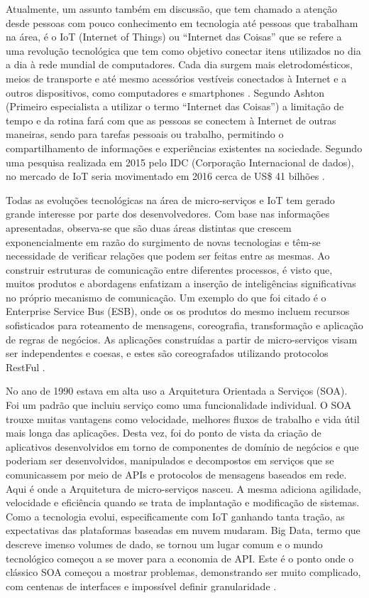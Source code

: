 \documentclass[journal]{IEEEtran}
\begin{document}
Atualmente, um assunto também em discussão, que tem chamado a atenção desde pessoas com pouco conhecimento em tecnologia até pessoas que trabalham na área, é o IoT (Internet of Things) ou “Internet das Coisas”  que se refere a uma revolução tecnológica que tem como objetivo conectar itens utilizados no dia a dia à rede mundial de computadores. Cada dia surgem mais eletrodomésticos, meios de transporte e até mesmo acessórios vestíveis conectados à Internet e a outros dispositivos, como computadores e smartphones \cite{PedroZambarda}. Segundo Ashton (Primeiro especialista a utilizar o termo “Internet das Coisas”) \cite{Finep} a limitação de tempo e da rotina fará com que as pessoas se conectem à Internet de outras maneiras, sendo para tarefas pessoais ou trabalho, permitindo o compartilhamento de informações e experiências existentes na sociedade. Segundo uma pesquisa realizada em 2015 pelo IDC (Corporação Internacional de dados), no mercado de IoT seria movimentado em 2016 cerca de US\$ 41 bilhões \cite{idc2017}. 


Todas as evoluções tecnológicas na área de micro-serviços e IoT tem gerado grande interesse por parte dos desenvolvedores. Com base nas informações apresentadas, observa-se que são duas áreas distintas que crescem exponencialmente em razão do surgimento de novas tecnologias e têm-se necessidade de verificar relações que podem ser feitas entre as mesmas.  Ao construir estruturas de comunicação entre diferentes processos, é visto que, muitos produtos e abordagens enfatizam a inserção de inteligências significativas no próprio mecanismo de comunicação. Um exemplo do que foi citado é o Enterprise Service Bus (ESB), onde os os produtos do mesmo incluem recursos sofisticados para roteamento de mensagens, coreografia, transformação e aplicação de regras de negócios. As aplicações construídas a partir de micro-serviços visam ser independentes e coesas, e estes são coreografados utilizando protocolos RestFul \cite{martinfowleretal}. 

No ano de 1990 estava em alta uso a Arquitetura Orientada a Serviços (SOA). Foi um padrão que incluiu serviço como uma funcionalidade individual. O SOA trouxe muitas vantagens como velocidade, melhores fluxos de trabalho e vida útil mais longa das aplicações. Desta vez, foi do ponto de vista da criação de aplicativos desenvolvidos em torno de componentes de domínio de negócios e que poderiam ser desenvolvidos, manipulados e decompostos em serviços que se comunicassem por meio de APIs e protocolos de mensagens baseados em rede. Aqui é onde a Arquitetura de micro-serviços nasceu. A mesma adiciona agilidade, velocidade e eficiência quando se trata de implantação e modificação de sistemas. Como a tecnologia evolui, especificamente com IoT ganhando tanta tração, as expectativas das plataformas baseadas em nuvem mudaram. Big Data, termo que descreve imenso volumes de dado, se tornou um lugar comum e o mundo tecnológico começou a se mover para a economia de API. Este é o ponto onde o clássico SOA começou a mostrar problemas, demonstrando ser muito complicado, com centenas de interfaces e impossível definir granularidade \cite{manutayal2016}.
\end{document}
